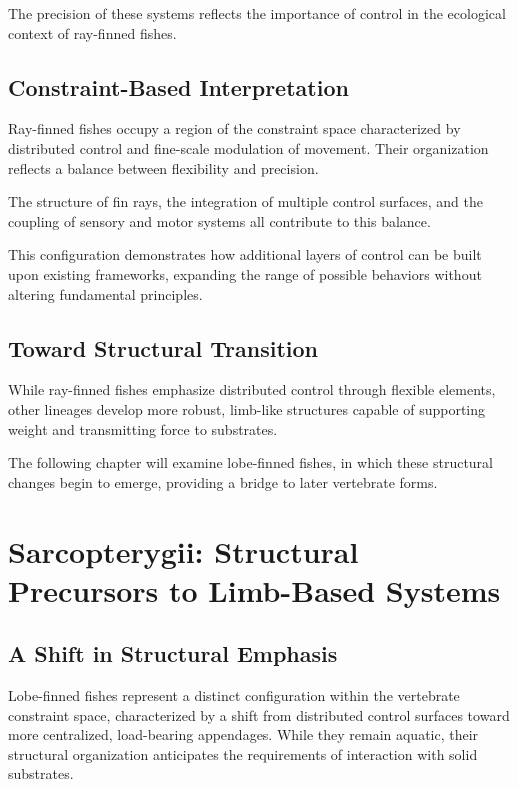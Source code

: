 \documentclass[11pt,oneside]{book}
\begin{document}
The precision of these systems reflects the importance of control in the ecological context of ray-finned fishes.

\section{Constraint-Based Interpretation}

Ray-finned fishes occupy a region of the constraint space characterized by distributed control and fine-scale modulation of movement. Their organization reflects a balance between flexibility and precision.

The structure of fin rays, the integration of multiple control surfaces, and the coupling of sensory and motor systems all contribute to this balance.

This configuration demonstrates how additional layers of control can be built upon existing frameworks, expanding the range of possible behaviors without altering fundamental principles.

\section{Toward Structural Transition}

While ray-finned fishes emphasize distributed control through flexible elements, other lineages develop more robust, limb-like structures capable of supporting weight and transmitting force to substrates.

The following chapter will examine lobe-finned fishes, in which these structural changes begin to emerge, providing a bridge to later vertebrate forms.

\chapter{Sarcopterygii: Structural Precursors to Limb-Based Systems}

\section{A Shift in Structural Emphasis}

Lobe-finned fishes represent a distinct configuration within the vertebrate constraint space, characterized by a shift from distributed control surfaces toward more centralized, load-bearing appendages. While they remain aquatic, their structural organization anticipates the requirements of interaction with solid substrates.
\end{document}
